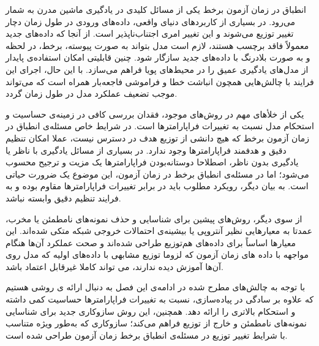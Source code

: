 

انطباق در زمان آزمون برخط یکی از مسائل کلیدی در یادگیری ماشین مدرن به شمار می‌رود. در بسیاری از کاربردهای دنیای واقعی، داده‌های ورودی در طول زمان دچار تغییر توزیع می‌شوند و این تغییر امری اجتناب‌ناپذیر است. از آنجا که داده‌های جدید معمولاً فاقد برچسب هستند، لازم است مدل بتواند به صورت پیوسته، برخط، در لحظه و به صورت بلادرنگ با داده‌های جدید سازگار شود. چنین قابلیتی امکان استفاده‌ی پایدار از مدل‌های یادگیری عمیق را در محیط‌های پویا فراهم می‌سازد. با این حال، اجرای این فرایند با چالش‌هایی همچون انباشت خطا و فراموشی فاجعه‌بار همراه است که می‌تواند موجب تضعیف عملکرد مدل در طول زمان گردد.

یکی از خلأهای مهم در روش‌های موجود، فقدان بررسی کافی در زمینه‌ی حساسیت و استحکام مدل نسبت به تغییرات فراپارامترها است. در شرایط خاص مسئله‌ی انطباق در زمان آزمون برخط که هیچ دانشی از توزیع هدف در دسترس نیست، عملا امکان تنظیم دقیق و هدفمند فراپارامترها وجود ندارد. در بسیاری از مسائل یادگیری با ناظر یا یادگیری بدون ناظر، اصطلاحا {دوستانه‌بودن فراپارامترها} یک مزیت و ترجیح محسوب می‌شود؛ اما در مسئله‌ی انطباق برخط در زمان آزمون، این موضوع یک ضرورت حیاتی است. به بیان دیگر، رویکرد مطلوب باید در برابر تغییرات فراپارامترها مقاوم بوده و به فرایند {تنظیم دقیق} وابسته نباشد.

از سوی دیگر، روش‌های پیشین برای شناسایی و حذف نمونه‌های نامطمئن یا مخرب، عمدتا به معیارهایی نظیر آنتروپی یا بیشینه‌ی احتمالات خروجی شبکه متکی شده‌اند. این معیارها اساساً برای داده‌های هم‌توزیع طراحی شده‌اند و صحت عملکرد آن‌ها هنگام مواجهه با داده های زمان آزمون که لزوما توزیع مشابهی با داده‌های اولیه که مدل روی آن‌ها آموزش دیده ندارند، می تواند کاملا غیرقابل اعتماد باشد.

با توجه به چالش‌های مطرح شده در ادامه‌ی این فصل به دنبال ارائه ی روشی هستیم که علاوه بر سادگی در پیاده‌سازی، نسبت به تغییرات فراپارامترها حساسیت کمی داشته و استحکام بالاتری را ارائه دهد. همچنین، این روش سازوکاری جدید برای شناسایی نمونه‌های نامطمئن و خارج از توزیع فراهم می‌کند؛ سازوکاری که به‌طور ویژه متناسب با شرایط تغییر توزیع در مسئله‌ی انطباق برخط زمان آزمون طراحی شده است.


